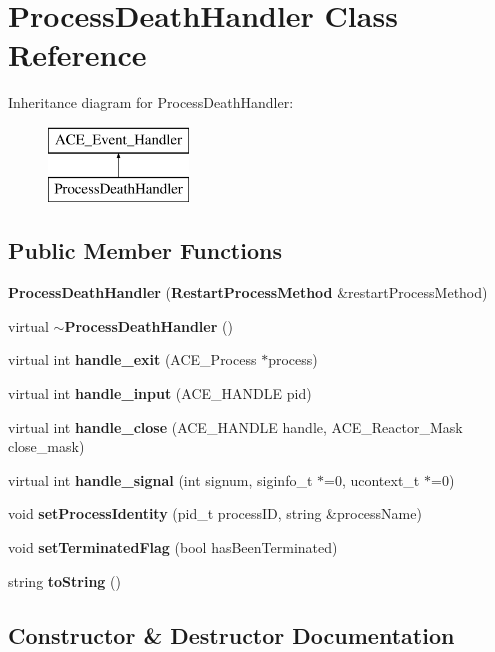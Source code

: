\section{Process\+Death\+Handler Class Reference}
\label{classProcessDeathHandler}
Inheritance diagram for Process\+Death\+Handler\+:\begin{figure}[H]
\begin{center}
\leavevmode
\includegraphics[height=2.000000cm]{classProcessDeathHandler}
\end{center}
\end{figure}
\subsection*{Public Member Functions}
\begin{DoxyCompactItemize}
\item 
{\bf Process\+Death\+Handler} ({\bf Restart\+Process\+Method} \&restart\+Process\+Method)
\item 
virtual {\bf $\sim$\+Process\+Death\+Handler} ()
\item 
virtual int {\bf handle\+\_\+exit} (A\+C\+E\+\_\+\+Process $\ast$process)
\item 
virtual int {\bf handle\+\_\+input} (A\+C\+E\+\_\+\+H\+A\+N\+D\+LE pid)
\item 
virtual int {\bf handle\+\_\+close} (A\+C\+E\+\_\+\+H\+A\+N\+D\+LE handle, A\+C\+E\+\_\+\+Reactor\+\_\+\+Mask close\+\_\+mask)
\item 
virtual int {\bf handle\+\_\+signal} (int signum, siginfo\+\_\+t $\ast$=0, ucontext\+\_\+t $\ast$=0)
\item 
void {\bf set\+Process\+Identity} (pid\+\_\+t process\+ID, string \&process\+Name)
\item 
void {\bf set\+Terminated\+Flag} (bool has\+Been\+Terminated)
\item 
string {\bf to\+String} ()
\end{DoxyCompactItemize}


\subsection{Constructor \& Destructor Documentation}
